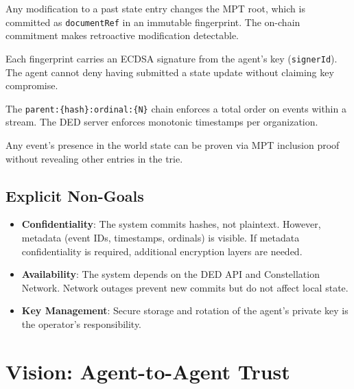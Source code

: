 \documentclass[11pt,a4paper]{article}
\begin{document}
\begin{description}[leftmargin=2cm, style=nextline]
  \item[Tamper Evidence]
    Any modification to a past state entry changes the MPT root, which is committed as
    \texttt{documentRef} in an immutable fingerprint. The on-chain commitment makes
    retroactive modification detectable.

  \item[Non-Repudiation]
    Each fingerprint carries an ECDSA signature from the agent's key (\texttt{signerId}).
    The agent cannot deny having submitted a state update without claiming key compromise.

  \item[Temporal Ordering]
    The \texttt{parent:\{hash\}:ordinal:\{N\}} chain enforces a total order on events
    within a stream. The DED server enforces monotonic timestamps per organization.

  \item[Inclusion Provability]
    Any event's presence in the world state can be proven via MPT inclusion proof without
    revealing other entries in the trie.
\end{description}

\subsection{Explicit Non-Goals}

\begin{itemize}
  \item \textbf{Confidentiality}: The system commits hashes, not plaintext. However,
    metadata (event IDs, timestamps, ordinals) is visible. If metadata confidentiality is
    required, additional encryption layers are needed.
  \item \textbf{Availability}: The system depends on the DED API and Constellation
    Network. Network outages prevent new commits but do not affect local state.
  \item \textbf{Key Management}: Secure storage and rotation of the agent's private key is
    the operator's responsibility.
\end{itemize}


\section{Vision: Agent-to-Agent Trust}
\end{document}
